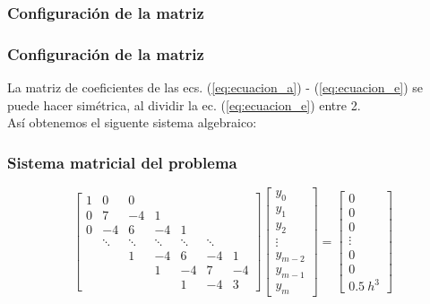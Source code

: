 \subsubsection{Configuración de la matriz}
\begin{frame}
\frametitle{Configuración de la matriz}
La matriz de coeficientes de las ecs. (\ref{eq:ecuacion_a}) - (\ref{eq:ecuacion_e}) se puede hacer simétrica, al dividir la ec. (\ref{eq:ecuacion_e}) entre 2.
\\
\bigskip
Así obtenemos el siguente sistema algebraico:
\end{frame}
\begin{frame}
\frametitle{Sistema matricial del problema}
\[
\begin{bmatrix}
1 &  0 &  0 &    &   & & \\
0 &  7 & -4 &  1 &   & & \\
0 & -4 &  6 & -4 & 1 & & \\
  & \ddots & \ddots & \ddots & \ddots & \ddots & \\
  &  &  1 & -4 & 6 & -4 & 1 \\
  &  &  & 1 & -4 & 7 & -4 \\
  &  &  &   &  1 & -4 & 3
\end{bmatrix}
\begin{bmatrix}
y_{0} \\
y_{1} \\
y_{2} \\
\vdots \\
y_{m-2} \\
y_{m-1} \\
y_{m}
\end{bmatrix} = 
\begin{bmatrix}
0 \\
0 \\
0 \\
\vdots \\
0 \\
0 \\
0.5 \: h^{3}
\end{bmatrix} \]
\end{frame}
